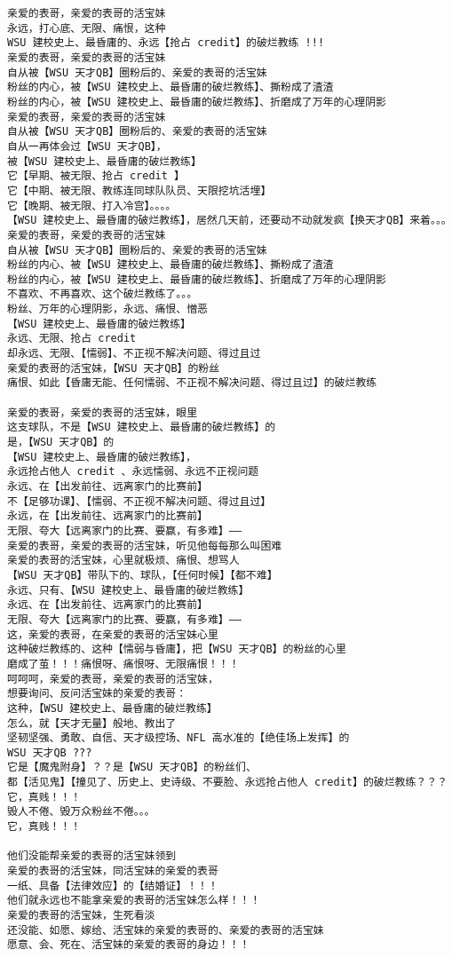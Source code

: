 \documentclass[9pt, b5paper]{article}
\begin{document}
\begin{verbatim}
亲爱的表哥，亲爱的表哥的活宝妹
永远，打心底、无限、痛恨，这种
WSU 建校史上、最昏庸的、永远【抢占 credit】的破烂教练 !!!
亲爱的表哥，亲爱的表哥的活宝妹
自从被【WSU 天才QB】圈粉后的、亲爱的表哥的活宝妹
粉丝的内心，被【WSU 建校史上、最昏庸的破烂教练】、撕粉成了渣渣
粉丝的内心，被【WSU 建校史上、最昏庸的破烂教练】、折磨成了万年的心理阴影
亲爱的表哥，亲爱的表哥的活宝妹
自从被【WSU 天才QB】圈粉后的、亲爱的表哥的活宝妹
自从一再体会过【WSU 天才QB】，
被【WSU 建校史上、最昏庸的破烂教练】
它【早期、被无限、抢占 credit 】
它【中期、被无限、教练连同球队队员、天限挖坑活埋】
它【晚期、被无限、打入冷宫】。。。。
【WSU 建校史上、最昏庸的破烂教练】，居然几天前，还要动不动就发疯【换天才QB】来着。。。
亲爱的表哥，亲爱的表哥的活宝妹
自从被【WSU 天才QB】圈粉后的、亲爱的表哥的活宝妹
粉丝的内心、被【WSU 建校史上、最昏庸的破烂教练】、撕粉成了渣渣
粉丝的内心，被【WSU 建校史上、最昏庸的破烂教练】、折磨成了万年的心理阴影
不喜欢、不再喜欢、这个破烂教练了。。。
粉丝、万年的心理阴影，永远、痛恨、憎恶
【WSU 建校史上、最昏庸的破烂教练】
永远、无限、抢占 credit
却永远、无限、【懦弱】、不正视不解决问题、得过且过
亲爱的表哥的活宝妹，【WSU 天才QB】的粉丝
痛恨、如此【昏庸无能、任何懦弱、不正视不解决问题、得过且过】的破烂教练

亲爱的表哥，亲爱的表哥的活宝妹，眼里
这支球队，不是【WSU 建校史上、最昏庸的破烂教练】的
是，【WSU 天才QB】的
【WSU 建校史上、最昏庸的破烂教练】，
永远抢占他人 credit 、永远懦弱、永远不正视问题
永远、在【出发前往、远离家门的比赛前】
不【足够功课】、【懦弱、不正视不解决问题、得过且过】
永远，在【出发前往、远离家门的比赛前】
无限、夸大【远离家门的比赛、要赢，有多难】——
亲爱的表哥，亲爱的表哥的活宝妹，听见他每每那么叫困难
亲爱的表哥的活宝妹，心里就极烦、痛恨、想骂人
【WSU 天才QB】带队下的、球队，【任何时候】【都不难】
永远、只有、【WSU 建校史上、最昏庸的破烂教练】
永远、在【出发前往、远离家门的比赛前】
无限、夸大【远离家门的比赛、要赢，有多难】——
这，亲爱的表哥，在亲爱的表哥的活宝妹心里
这种破烂教练的、这种【懦弱与昏庸】，把【WSU 天才QB】的粉丝的心里
磨成了茧！！！痛恨呀、痛恨呀、无限痛恨！！！
呵呵呵，亲爱的表哥，亲爱的表哥的活宝妹，
想要询问、反问活宝妹的亲爱的表哥：
这种，【WSU 建校史上、最昏庸的破烂教练】
怎么，就【天才无量】般地、教出了
坚韧坚强、勇敢、自信、天才级控场、NFL 高水准的【绝佳场上发挥】的
WSU 天才QB ???
它是【魔鬼附身】？？是【WSU 天才QB】的粉丝们、
都【活见鬼】【撞见了、历史上、史诗级、不要脸、永远抢占他人 credit】的破烂教练？？？
它，真贱！！！
毁人不倦、毁万众粉丝不倦。。。
它，真贱！！！

他们没能帮亲爱的表哥的活宝妹领到
亲爱的表哥的活宝妹，同活宝妹的亲爱的表哥
一纸、具备【法律效应】的【结婚证】！！！
他们就永远也不能拿亲爱的表哥的活宝妹怎么样！！！
亲爱的表哥的活宝妹，生死看淡
还没能、如愿、嫁给、活宝妹的亲爱的表哥的、亲爱的表哥的活宝妹
愿意、会、死在、活宝妹的亲爱的表哥的身边！！！


\end{verbatim}
\end{document}
